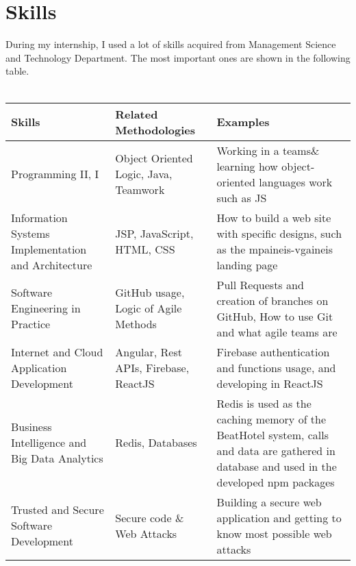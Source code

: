 
\chapter{Skills} %

\label{Chapter6}

During my internship, I used a lot of skills acquired from Management Science and Technology Department. The most important ones are shown in the following table. \\ \\

\begin{center}
	\begin{tabular}{ | p{6cm} | p{5cm} | p{5cm} |}
		\hline
		\textbf{Skills}					
						& \textbf{Related Methodologies} 
										& \textbf{Examples}	\\[0.5cm] \hline
		
		Programming II, I 					
						& Object Oriented Logic, Java, Teamwork
										& Working in a teams\& learning how object-oriented languages work such as JS\\[0.2cm] \hline
		Information Systems Implementation 
		 and Architecture 					
		 				& JSP, JavaScript, HTML, CSS 
		 								& How to build a web site with specific designs, such as the mpaineis-vgaineis landing page \\[0.2cm] \hline
		Software Engineering in Practice 	
						& GitHub usage, Logic of Agile Methods
										& Pull Requests and creation of branches on GitHub,
										How to use Git and what agile teams are  \\[0.2cm] \hline	
		Internet and 
			Cloud Application Development 	
						& Angular, Rest APIs, Firebase, ReactJS
										& Firebase authentication and functions usage, and developing in ReactJS \\[0.2cm] \hline	
		Business Intelligence and 
		 Big Data Analytics 				
		 				& Redis, Databases 
		 								& Redis is used as the caching memory of the BeatHotel system, calls and data are gathered in database and used in the developed npm packages\\[0.2cm] \hline
		Trusted and 
			Secure Software Development		
						& Secure code \& Web Attacks 
										& Building a secure web application and getting to know most possible web attacks \\[0.2cm] \hline
	\end{tabular}
\end{center}

